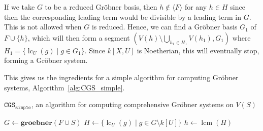 \documentclass[a4paper, 12pt]{article}
\DeclareMathOperator{\LC}{lc}
\DeclareMathOperator{\lcm}{lcm}
\theoremstyle{changedot}
\theoremstyle{changedotbreak}
\theoremstyle{nonumberplain}
\begin{document}
If we take $G$ to be a reduced Gröbner basis, then $h \notin \langle F \rangle$ for any $h \in H$ since then the corresponding leading term would be divisible by a leading term in $G$. This is not allowed when $G$ is reduced. Hence, we can find a Gröbner basis $G_{1}$ of $F \cup \{h\}$, which will then form a segment $(V(h) \setminus \bigcup_{h_{1} \in H_{1}} V(h_{1}), G_{1})$ where $H_{1} = \{\LC_{U}(g) \mid g \in G_{1}\}$. Since $k[X, U]$ is Noetherian, this will eventually stop, forming a Gröbner system.

This gives us the ingredients for a simple algorithm for computing Gröbner systems, Algorithm~\ref{alg:CGS_simple}.

\begin{algorithm}\label{alg:CGS_simple}
  \caption{$\mathtt{CGS_{simple}}$, an algorithm for computing comprehensive Gröbner systems on $V(S)$}
    {
    \KwRet{\emptyset}\;
  } {
    $G \gets \mathbf{groebner}(F \cup S)$\;
    $H \gets \{\LC_{U}(g) \mid g \in G \setminus k[U]\}$\;
    $h \gets \lcm(H)$\;
  }
\end{algorithm}
\end{document}
